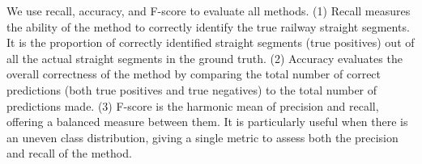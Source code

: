 We use recall, accuracy, and F-score to evaluate all methods.
(1) Recall measures the ability of the method to correctly identify the true railway straight segments. 
It is the proportion of correctly identified straight segments (true positives) out of all the actual straight segments in the ground truth.
(2) Accuracy evaluates the overall correctness of the method by comparing the total number of correct predictions (both true positives and true negatives) to the total number of predictions made.
(3) F-score is the harmonic mean of precision and recall, offering a balanced measure between them. It is particularly useful when there is an uneven class distribution, giving a single metric to assess both the precision and recall of the method.

